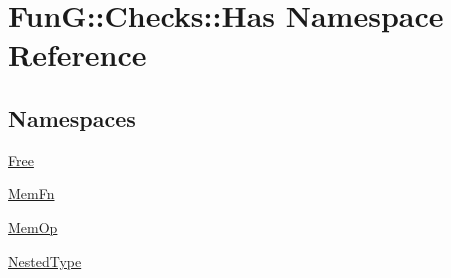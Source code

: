 \hypertarget{namespaceFunG_1_1Checks_1_1Has}{}\section{FunG\+:\+:Checks\+:\+:Has Namespace Reference}
\label{namespaceFunG_1_1Checks_1_1Has}
\subsection*{Namespaces}
\begin{DoxyCompactItemize}
\item 
 \hyperlink{namespaceFunG_1_1Checks_1_1Has_1_1Free}{Free}
\item 
 \hyperlink{namespaceFunG_1_1Checks_1_1Has_1_1MemFn}{Mem\+Fn}
\item 
 \hyperlink{namespaceFunG_1_1Checks_1_1Has_1_1MemOp}{Mem\+Op}
\item 
 \hyperlink{namespaceFunG_1_1Checks_1_1Has_1_1NestedType}{Nested\+Type}
\end{DoxyCompactItemize}
